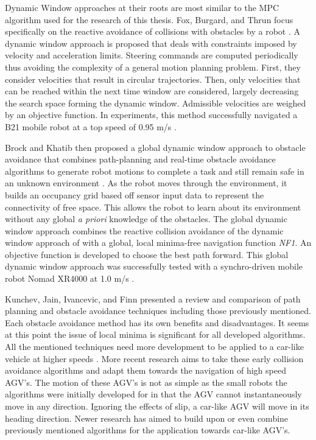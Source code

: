 \documentclass[12pt,onecolumn]{report}
\begin{document}
Dynamic Window approaches at their roots are most similar to the MPC algorithm used for the research of this thesis. Fox, Burgard, and Thrun focus specifically on the reactive avoidance of collisions with obstacles by a robot \cite{Fox1997}. A dynamic window approach is proposed that deals with constraints imposed by velocity and acceleration limits. Steering commands are computed periodically thus avoiding the complexity of a general motion planning problem. First, they consider velocities that result in circular trajectories. Then, only velocities that can be reached within the next time window are considered, largely decreasing the search space forming the dynamic window. Admissible velocities are weighed by an objective function. In experiments, this method successfully navigated a B21 mobile robot at a top speed of 0.95 m/s \cite{Fox1997}.

Brock and Khatib then proposed a global dynamic window approach to obstacle avoidance that combines path-planning and real-time obstacle avoidance algorithms to generate robot motions to complete a task and still remain safe in an unknown environment \cite{Brock&Khatib1999}. As the robot moves through the environment, it builds an occupancy grid based off sensor input data to represent the connectivity of free space. This allows the robot to learn about its environment without any global \textit{a priori} knowledge of the obstacles. The global dynamic window approach combines the reactive collision avoidance of the dynamic window approach of \cite{Fox1997} with a global, local minima-free navigation function \textit{NF1}. An objective function is developed to choose the best path forward. This global dynamic window approach was successfully tested with a synchro-driven mobile robot Nomad XR4000 at 1.0 m/s \cite{Brock&Khatib1999}.

Kunchev, Jain, Ivancevic, and Finn presented a review and comparison of path planning and obstacle avoidance techniques including those previously mentioned. Each obstacle avoidance method has its own benefits and disadvantages. It seems at this point the issue of local minima is significant for all developed algorithms. All the mentioned techniques need more development to be applied to a car-like vehicle at higher speeds \cite{Kunchev1999}. More recent research aims to take these early collision avoidance algorithms and adapt them towards the navigation of high speed AGV's. The motion of these AGV's is not as simple as the small robots the algorithms were initially developed for in that the AGV cannot instantaneously move in any direction. Ignoring the effects of slip, a car-like AGV will move in its heading direction. Newer research has aimed to build upon or even combine previously mentioned algorithms for the application towards car-like AGV's.
\end{document}
